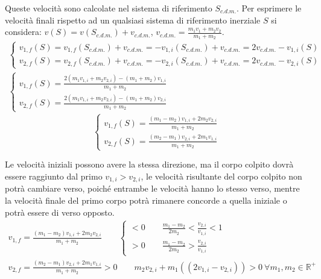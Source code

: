 \documentclass{article}
\numberwithin{equation}{subsection}
\begin{document}
Queste velocità sono calcolate nel sistema di riferimento $S_{c.d.m.}$. Per esprimere le velocità finali rispetto ad un qualsiasi sistema di riferimento inerziale 
$S$ si considera: $v(S)=v(S_{c.d.m.})+v_{c.d.m.}$, $v_{c.d.m.}=\displaystyle\frac{m_1v_1+m_2v_2}{m_1+m_2}$. 
\begin{gather*}
    \begin{cases}
        v_{1,f}(S)=v_{1,f}(S_{c.d.m.})+v_{c.d.m.}=-v_{1,i}(S_{c.d.m.})+v_{c.d.m.}=2v_{c.d.m.}-v_{1,i}(S)\\
        v_{2,f}(S)=v_{2,f}(S_{c.d.m.})+v_{c.d.m.}=-v_{2,i}(S_{c.d.m.})+v_{c.d.m.}=2v_{c.d.m.}-v_{2,i}(S)
    \end{cases}\\
    \begin{cases}
        v_{1,f}(S)=\displaystyle\frac{2(m_1v_{1,i}+m_2v_{2,i})-(m_1+m_2)v_{1,i}}{m_1+m_2}\\
        v_{2,f}(S)=\displaystyle\frac{2(m_1v_{1,i}+m_2v_{2,i})-(m_1+m_2)v_{2,i}}{m_1+m_2}
    \end{cases}
\end{gather*}
\begin{equation}
    \begin{cases}
        v_{1,f}(S)=\displaystyle\frac{(m_1-m_2)v_{1,i}+2m_2v_{2,i}}{m_1+m_2}\\
        v_{2,f}(S)=\displaystyle\frac{(m_2-m_1)v_{2,i}+2m_1v_{1,i}}{m_1+m_2}
    \end{cases}
\end{equation}


Le velocità iniziali possono avere la stessa direzione, ma il 
corpo colpito dovrà essere raggiunto dal primo $v_{1,i}>v_{2,i}$, 
le velocità risultante del corpo colpito non potrà cambiare 
verso, poiché entrambe le velocità hanno lo stesso verso, mentre 
la velocità finale del primo corpo potrà rimanere concorde a 
quella iniziale o potrà essere di verso opposto.
\begin{gather*}
    \displaystyle v_{1,f}=\frac{(m_1-m_2)v_{1,i}+2m_2v_{2,i}}{m_1+m_2}\qquad
    \begin{cases}
        <0\qquad\displaystyle\frac{m_1-m_2}{2m_2}<\frac{v_{2,i}}{v_{1,i}}<1\\
        >0\qquad\displaystyle\frac{m_1-m_2}{2m_2}>\frac{v_{2,i}}{v_{1,i}}
    \end{cases}\\
    \displaystyle v_{2,f}=\frac{(m_2-m_1)v_{2,i}+2m_1v_{1,i}}{m_1+m_2}>0 \qquad m_2v_{2,i}+m_1((2v_{1,i}-v_{2,i}))>0\:\forall m_1,m_2\in\mathbb{R}^+
\end{gather*}
\end{document}
